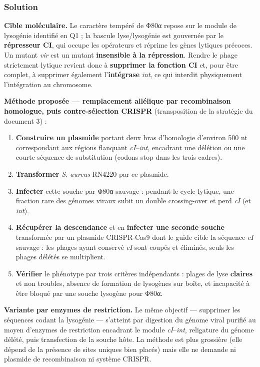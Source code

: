 \documentclass[11pt,a4paper]{article}
\providecommand{\tightlist}{\setlength{\itemsep}{0pt}\setlength{\parskip}{0pt}}
\begin{document}
\hypertarget{solution-6}{%
\subsubsection{Solution}\label{solution-6}}

\textbf{Cible moléculaire.} Le caractère tempéré de Φ80α repose sur le module de lysogénie identifié en Q1 ; la bascule lyse/lysogénie est gouvernée par le \textbf{répresseur CI}, qui occupe les opérateurs et réprime les gènes lytiques précoces. Un mutant \emph{vir} est un mutant \textbf{insensible à la répression}. Rendre le phage strictement lytique revient donc à \textbf{supprimer la fonction CI} et, pour être complet, à supprimer également l'\textbf{intégrase} \emph{int}, ce qui interdit physiquement l'intégration au chromosome.

\textbf{Méthode proposée --- remplacement allélique par recombinaison homologue, puis contre-sélection CRISPR} (transposition de la stratégie du document 3) :

\begin{enumerate}
\def\labelenumi{\arabic{enumi}.}
\tightlist
\item
  \textbf{Construire un plasmide} portant deux bras d'homologie d'environ 500 nt correspondant aux régions flanquant \emph{cI}--\emph{int}, encadrant une délétion ou une courte séquence de substitution (codons stop dans les trois cadres).
\item
  \textbf{Transformer} \emph{S. aureus} RN4220 par ce plasmide.
\item
  \textbf{Infecter} cette souche par Φ80α sauvage : pendant le cycle lytique, une fraction rare des génomes viraux subit un double crossing-over et perd \emph{cI} (et \emph{int}).
\item
  \textbf{Récupérer la descendance} et en \textbf{infecter une seconde souche} transformée par un plasmide CRISPR-Cas9 dont le guide cible la séquence \emph{cI} sauvage : les phages ayant conservé \emph{cI} sont coupés et éliminés, seuls les phages délétés se multiplient.
\item
  \textbf{Vérifier} le phénotype par trois critères indépendants : plages de lyse \textbf{claires} et non troubles, absence de formation de lysogènes sur boîte, et incapacité à être bloqué par une souche lysogène pour Φ80α.
\end{enumerate}

\textbf{Variante par enzymes de restriction.} Le même objectif --- supprimer les séquences codant la lysogénie --- s'atteint par digestion du génome viral purifié au moyen d'enzymes de restriction encadrant le module \emph{cI}--\emph{int}, religature du génome délété, puis transfection de la souche hôte. La méthode est plus grossière (elle dépend de la présence de sites uniques bien placés) mais elle ne demande ni plasmide de recombinaison ni système CRISPR.
\end{document}
